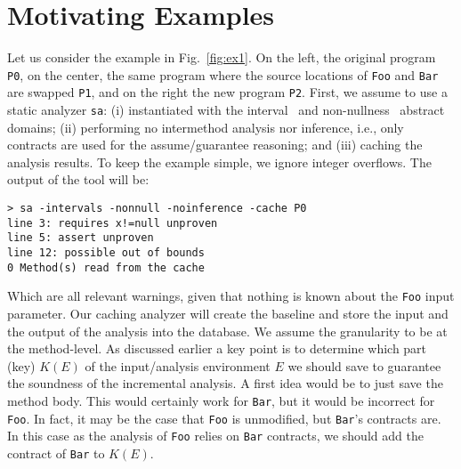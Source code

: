 \documentclass{llncs}
\newcommand{\code}[1]{\lstinline{#1}}
\begin{document}
\section{Motivating Examples}

Let us consider the example in Fig.~\ref{fig:ex1}.
On the left, the original program \code{P0}, on the center, the same program where the source locations of \code{Foo} and \code{Bar} are swapped \code{P1}, and on the right the new program \code{P2}.
First, we assume to use a static analyzer \code{sa}: (i) instantiated with the interval~\cite{CousotCousot77} and non-nullness~\cite{FahndrichLeino-OOPSLA03} abstract domains;  (ii) performing no intermethod analysis nor inference, i.e., only contracts are used for the assume/guarantee reasoning; and (iii) caching the analysis results.
To keep the example simple, we ignore integer overflows.
The output of the tool will be:
\begin{lstlisting}
> sa -intervals -nonnull -noinference -cache P0 
line 3: requires x!=null unproven
line 5: assert unproven
line 12: possible out of bounds
0 Method(s) read from the cache
\end{lstlisting}
Which are all relevant warnings, given that nothing is known about the \code{Foo} input parameter.
Our caching analyzer will create the baseline and store the input and the output of the analysis into the database.
We assume the granularity to be at the method-level.
As discussed earlier a key point is to determine which part (key) $K(E)$ of the input/analysis environment $E$ we should save to guarantee the soundness of the incremental analysis.
A first idea would be to just save the method body.
This would certainly work for \code{Bar}, but it would be incorrect for \code{Foo}.
In fact, it may be the case that \code{Foo} is unmodified, but \code{Bar}'s contracts are.
In this case as the analysis of  \code{Foo} relies on \code{Bar} contracts, we should add the contract of \code{Bar} to $K(E)$.
\end{document}
